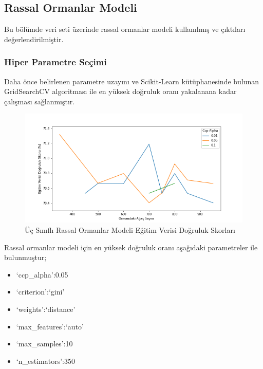 \documentclass[12pt,twoside]{deuthesis}
\providecommand{\tightlist}{%
  \setlength{\itemsep}{0pt}\setlength{\parskip}{0pt}}
\begin{document}
\hypertarget{mult_rf}{%
\subsection{Rassal Ormanlar Modeli}\label{mult_rf}}

Bu bölümde veri seti üzerinde rassal ormanlar modeli kullanılmış ve çıktıları değerlendirilmiştir.

\hypertarget{hiper-parametre-seuxe7imi-1}{%
\subsubsection{Hiper Parametre Seçimi}\label{hiper-parametre-seuxe7imi-1}}

Daha önce belirlenen parametre uzayını ve Scikit-Learn kütüphanesinde bulunan GridSearchCV algoritması ile en yüksek doğruluk oranı yakalanana kadar çalışması sağlanmıştır.
\begin{figure}

{\centering \includegraphics[width=1.1\linewidth,height=0.5\textheight]{figure/RF_Grid_Graph} 

}

\caption{Üç Sınıflı Rassal Ormanlar Modeli Eğitim Verisi Doğruluk Skorları}\label{fig:unnamed-chunk-29}
\end{figure}
Rassal ormanlar modeli için en yüksek doğruluk oranı aşağıdaki parametreler ile bulunmuştur;
\begin{itemize}
\tightlist
\item
  `ccp\_alpha':0.05
\item
  `criterion':`gini'
\item
  `weights':`distance'
\item
  `max\_features':`auto'
\item
  `max\_samples':10
\item
  `n\_estimators':350
\end{itemize}
\newpage
\end{document}
